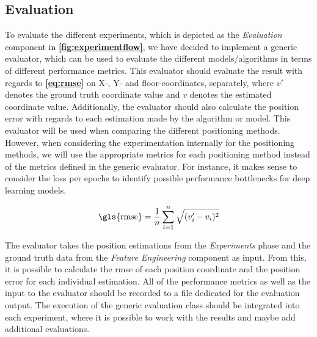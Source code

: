 \subsection{Evaluation}
To evaluate the different experiments, which is depicted as the \textit{Evaluation} component in \textbf{\autoref{fig:experimentflow}}, we have decided to implement a generic evaluator, which can be used to evaluate the different models/algorithms in terms of different performance metrics.
This evaluator should evaluate the result with regards to \textbf{\autoref{eq:rmse}} on X-, Y- and floor-coordinates, separately, where $v'$ denotes the ground truth coordinate value and $v$ denotes the estimated coordinate value. Additionally, the evaluator should also calculate the position error with regards to each estimation made by the algorithm or model. This evaluator will be used when comparing the different positioning methods. However, when considering the experimentation internally for the positioning methods, we will use the appropriate metrics for each positioning method instead of the metrics defined in the generic evaluator. For instance, it makes sense to consider the loss per epochs to identify possible performance bottlenecks for deep learning models.

\begin{equation}
    \text{\gls{rmse}} = \frac{1}{n} \sum_{i = 1}^{n} \sqrt{(v_{i}' - v_i)^2}
    \label{eq:rmse}
\end{equation}

The evaluator takes the position estimations from the \textit{Experiments} phase and the ground truth data from the \textit{Feature Engineering} component as input. From this, it is possible to calculate the \gls{rmse} of each position coordinate and the position error for each individual estimation. All of the performance metrics as well as the input to the evaluator should be recorded to a file dedicated for the evaluation output. The execution of the generic evaluation class should be integrated into each experiment, where it is possible to work with the results and maybe add additional evaluations.



